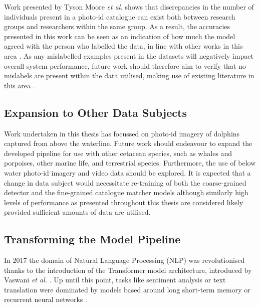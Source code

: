 Work presented by Tyson Moore \textit{et al.} \cite{tyson_moore_rise_2022} shows that discrepancies in the number of individuals present in a photo-id catalogue can exist both between research groups and researchers within the same group. As a result, the accuracies presented in this work can be seen as an indication of how much the model agreed with the person who labelled the data, in line with other works in this area \cite{boulent_scaling_2023}. As any mislabelled examples present in the datasets will negatively impact overall system performance, future work should therefore aim to verify that no mislabels are present within the data utilised, making use of existing literature in this area \cite{muller_identifying_2019, ekambaram_finding_2017}.


\subsection{Expansion to Other Data Subjects}\label{ch:Conclusion,sec:FutureWork,sub:Underwater,Video,OtherCetaceans}

Work undertaken in this thesis has focussed on photo-id imagery of dolphins captured from above the waterline. Future work should endeavour to expand the developed pipeline for use with other cetacean species, such as whales and porpoises, other marine life, and terrestrial species. Furthermore, the use of below water photo-id imagery \cite{van_bressem_visual_2018} and video data should be explored. It is expected that a change in data subject would necessitate re-training of both the coarse-grained detector and the fine-grained catalogue matcher models although similarly high levels of performance as presented throughout this thesis are considered likely provided sufficient amounts of data are utilised. 

\subsection{Transforming the Model Pipeline}\label{ch:Conclusion,sec:FutureWork,sub:Transformers}

In 2017 the domain of Natural Language Processing (NLP) was revolutionised thanks to the introduction of the Transformer model architecture, introduced by Vaswani \textit{et al.} \cite{vaswani_attention_2017}. Up until this point, tasks like sentiment analysis or text translation were dominated by models based around long short-term memory \cite{hochreiter_long_1997} or recurrent neural networks \cite{rumelhart_learning_1985}. 

